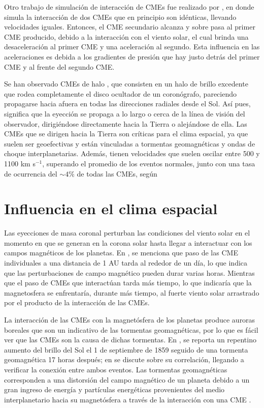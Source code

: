 Otro trabajo de simulación de interacción de \acp{CME} fue realizado por \textcite[][]{lugaz-2017}, en donde simula la interacción de dos CMEs que en principio son idénticas, llevando velocidades iguales. Entonces, el CME secundario alcanza y sobre pasa al primer CME producido, debido a la interacción con el viento solar, el cual brinda una desaceleración al primer CME y una aceleración al segundo. Esta influencia en las aceleraciones es debida a los gradientes de presión que hay justo detrás del primer CME y al frente del segundo CME.

Se han observado CMEs de halo \parencite[e.g.,][]{howard-1982, lamy-2019}, que consisten en un halo de brillo excedente que rodea completamente el disco ocultador de un coronógrafo, pareciendo propagarse hacia afuera en todas las direcciones radiales desde el Sol. Así pues, significa que la eyección se propaga a lo largo o cerca de la línea de visión del observador, dirigiéndose directamente hacia la Tierra o alejándose de ella. Las CMEs que se dirigen hacia la Tierra son críticas para el clima espacial, ya que suelen ser geoefectivas y están vinculadas a tormentas geomagnéticas y ondas de choque interplanetarias. Además, tienen velocidades que suelen oscilar entre 500 y 1100 km s$^{-1}$, superando el promedio de los eventos normales, junto con una tasa de ocurrencia del $\sim 4\%$ de todas las CMEs, según \textcite[e.g.,][]{lamy-2019, webb-2012}

\section{Influencia en el clima espacial}
Las eyecciones de masa coronal perturban las condiciones del viento solar en el momento en que se generan en la corona solar hasta llegar a interactuar con los campos magnéticos de los planetas. En \textcite[e.g.,][]{lugaz-2017}, se menciona que paso de las CME individuales a una distancia de 1 AU  tarda al rededor de un día, lo que indica que las perturbaciones de campo magnético pueden durar varias horas. Mientras que el paso de \acp{CME} que interactúan tarda más tiempo, lo que indicaría que la magnetosfera se enfrentaría, durante más tiempo, al fuerte viento solar arrastrado por el producto de la interacción de las CMEs.

La interacción de las CMEs con la magnetósfera de los planetas produce auroras boreales que son un indicativo de las tormentas geomagnéticas, por lo que es fácil ver que las CMEs son la causa de dichas tormentas. En \textcite[][]{carrington-1859, hodgson-1859}, se reporta un repentino aumento del brillo del Sol el 1 de septiembre de 1859 seguido de una tormenta geomagnética 17 horas después; en \textcite[][]{cliver-1994} se discute sobre su correlación, llegando a verificar la conexión entre ambos eventos.
Las tormentas geomagnéticas corresponden a una distorsión del campo magnético de un planeta debido a un gran ingreso de energía y partículas energéticas provenientes del medio interplanetario hacia su magnetósfera a través de la interacción con una CME \parencite[e.g,][]{2014swcm.book.....H}.


